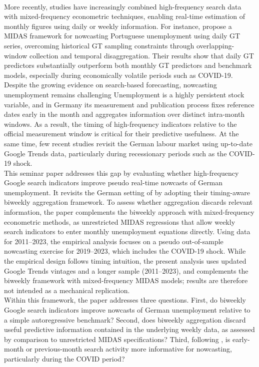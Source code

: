 \documentclass[12pt,a4paper]{article}
\begin{document}
\\
More recently, studies have increasingly combined high-frequency search data with mixed-frequency econometric techniques, enabling real-time estimation of monthly figures using daily or weekly information. For instance, \citet{COSTA2024101963} propose a MIDAS framework for nowcasting Portuguese unemployment using daily GT series, overcoming historical GT sampling constraints through overlapping-window collection and temporal disaggregation. Their results show that daily GT predictors substantially outperform both monthly GT predictors and benchmark models, especially during economically volatile periods such as COVID-19. \\
Despite the growing evidence on search-based forecasting, nowcasting unemployment remains challenging
Unemployment is a highly persistent stock variable, and in Germany its measurement and publication process fixes reference dates early in the month and aggregates information over distinct intra-month windows.
As a result, the timing of high-frequency indicators relative to the official measurement window is critical for their predictive usefulness. 
At the same time, few recent studies revisit the German labour market using up-to-date Google Trends data, particularly during recessionary periods such as the COVID-19 shock.\\
This seminar paper addresses this gap by evaluating whether high-frequency Google search indicators improve pseudo real-time nowcasts of German unemployment.
It revisits the German setting of \citet{Askitas} by adopting their timing-aware biweekly aggregation framework.
To assess whether aggregation discards relevant information, the paper complements the biweekly approach with mixed-frequency econometric methods, as unrestricted MIDAS regressions that allow weekly search indicators to enter monthly unemployment equations directly.
Using data for 2011--2023, the empirical analysis focuses on a pseudo out-of-sample nowcasting exercise for 2019--2023, which includes the COVID-19 shock.
While the empirical design follows \citet{Askitas} timing intuition, the present analysis uses updated Google Trends vintages and a longer sample (2011–2023), and complements the biweekly framework with mixed-frequency MIDAS models; results are therefore not intended as a mechanical replication.\\
Within this framework, the paper addresses three questions. First, do biweekly Google search indicators improve nowcasts of German unemployment relative to a simple autoregressive benchmark? Second, does biweekly aggregation discard useful predictive information contained in the underlying weekly data, as assessed by comparison to unrestricted MIDAS specifications? Third, following \citet{Askitas}, is early-month or previous-month search activity more informative for nowcasting, particularly during the COVID period?\\
\end{document}

